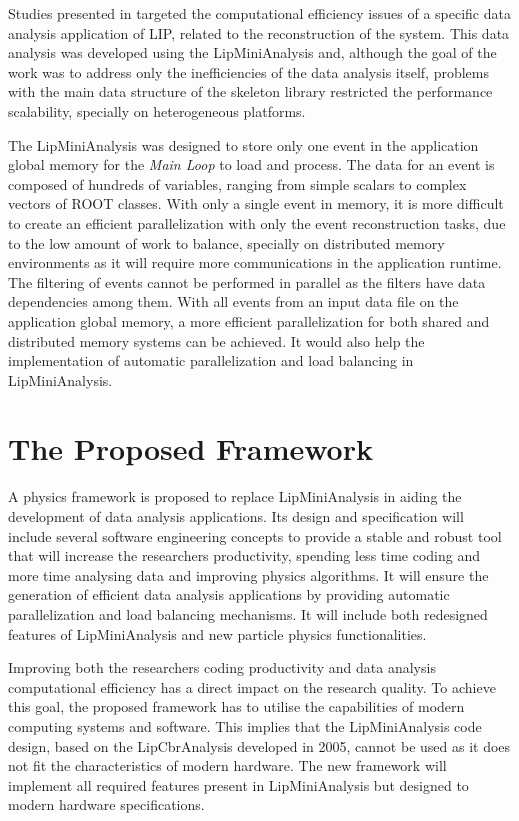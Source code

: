 Studies presented in \cite{Msc:AMP,paperAMP} targeted the computational efficiency issues of a specific data analysis application of LIP, related to the reconstruction of the \ttH system. This data analysis was developed using the LipMiniAnalysis and, although the goal of the work was to address only the inefficiencies of the data analysis itself, problems with the main data structure of the skeleton library restricted the performance scalability, specially on heterogeneous platforms.

The LipMiniAnalysis was designed to store only one event in the application global memory for the \textit{Main Loop} to load and process. The data for an event is composed of hundreds of variables, ranging from simple scalars to complex vectors of ROOT classes. With only a single event in memory, it is more difficult to create an efficient parallelization with only the event reconstruction tasks, due to the low amount of work to balance, specially on distributed memory environments as it will require more communications in the application runtime. The filtering of events cannot be performed in parallel as the filters have data dependencies among them. With all events from an input data file on the application global memory, a more efficient parallelization for both shared and distributed memory systems can be achieved. It would also help the implementation of automatic parallelization and load balancing in LipMiniAnalysis.

\section{The Proposed Framework}
\label{new_framework}

A physics framework is proposed to replace LipMiniAnalysis in aiding the development of data analysis applications. Its design and specification will include several software engineering concepts to provide a stable and robust tool that will increase the researchers productivity, spending less time coding and more time analysing data and improving physics algorithms. It will ensure the generation of efficient data analysis applications by providing automatic parallelization and load balancing mechanisms. It will include both redesigned features of LipMiniAnalysis and new particle physics functionalities.

Improving both the researchers coding productivity and data analysis computational efficiency has a direct impact on the research quality. To achieve this goal, the proposed framework has to utilise the capabilities of modern computing systems and software. This implies that the LipMiniAnalysis code design, based on the LipCbrAnalysis developed in 2005, cannot be used as it does not fit the characteristics of modern hardware. The new framework will implement all required features present in LipMiniAnalysis but designed to modern hardware specifications.

